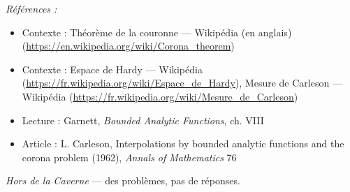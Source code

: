 \documentclass[11pt]{article}
\newenvironment{refs}{\par\small\noindent\emph{Références :}\begin{itemize}\setlength\itemsep{0pt}}{\end{itemize}\normalsize}
\begin{document}
\begin{refs}
\item Contexte : Théorème de la couronne --- Wikipédia (en anglais) (\url{https://en.wikipedia.org/wiki/Corona_theorem})
\item Contexte : Espace de Hardy --- Wikipédia (\url{https://fr.wikipedia.org/wiki/Espace_de_Hardy}), Mesure de Carleson --- Wikipédia (\url{https://fr.wikipedia.org/wiki/Mesure_de_Carleson})
\item Lecture : Garnett, \textit{Bounded Analytic Functions}, ch. VIII
\item Article : L. Carleson, \og{} Interpolations by bounded analytic functions and the corona problem \fg{} (1962), \textit{Annals of Mathematics} 76
\end{refs}

\bigskip


\vfill
\noindent\emph{Hors de la Caverne} --- des probl\`emes, pas de r\'eponses.
\end{document}
